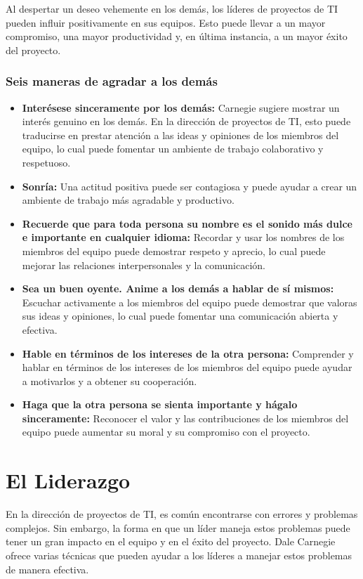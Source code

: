 \documentclass[journal]{IEEEtran}
\begin{document}
Al despertar un deseo vehemente en los demás, los líderes de proyectos de TI pueden influir positivamente en sus equipos. Esto puede llevar a un mayor compromiso, una mayor productividad y, en última instancia, a un mayor éxito del proyecto.

\subsubsection{Seis maneras de agradar a los demás}
\begin{itemize}
	\item \textbf{Interésese sinceramente por los demás:} Carnegie sugiere mostrar un interés genuino en los demás. En la dirección de proyectos de TI, esto puede traducirse en prestar atención a las ideas y opiniones de los miembros del equipo, lo cual puede fomentar un ambiente de trabajo colaborativo y respetuoso.
	\item \textbf{Sonría:} Una actitud positiva puede ser contagiosa y puede ayudar a crear un ambiente de trabajo más agradable y productivo.
	\item \textbf{Recuerde que para toda persona su nombre es el sonido más dulce e importante en cualquier idioma:} Recordar y usar los nombres de los miembros del equipo puede demostrar respeto y aprecio, lo cual puede mejorar las relaciones interpersonales y la comunicación.
	\item \textbf{Sea un buen oyente. Anime a los demás a hablar de sí mismos:} Escuchar activamente a los miembros del equipo puede demostrar que valoras sus ideas y opiniones, lo cual puede fomentar una comunicación abierta y efectiva.
	\item \textbf{Hable en términos de los intereses de la otra persona:} Comprender y hablar en términos de los intereses de los miembros del equipo puede ayudar a motivarlos y a obtener su cooperación.
	\item \textbf{Haga que la otra persona se sienta importante y hágalo sinceramente:} Reconocer el valor y las contribuciones de los miembros del equipo puede aumentar su moral y su compromiso con el proyecto.
\end{itemize}

\section{El Liderazgo}
En la dirección de proyectos de TI, es común encontrarse con errores y problemas complejos. Sin embargo, la forma en que un líder maneja estos problemas puede tener un gran impacto en el equipo y en el éxito del proyecto. Dale Carnegie ofrece varias técnicas que pueden ayudar a los líderes a manejar estos problemas de manera efectiva.
\end{document}
